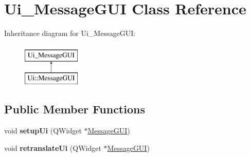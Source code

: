 \hypertarget{classUi__MessageGUI}{}\section{Ui\+\_\+\+Message\+G\+UI Class Reference}
\label{classUi__MessageGUI}
Inheritance diagram for Ui\+\_\+\+Message\+G\+UI\+:\begin{figure}[H]
\begin{center}
\leavevmode
\includegraphics[height=2.000000cm]{classUi__MessageGUI}
\end{center}
\end{figure}
\subsection*{Public Member Functions}
\begin{DoxyCompactItemize}
\item 
void {\bfseries setup\+Ui} (Q\+Widget $\ast$\hyperlink{classMessageGUI}{Message\+G\+UI})\hypertarget{classUi__MessageGUI_afab856f1f64d12128feb816c8755b846}{}\label{classUi__MessageGUI_afab856f1f64d12128feb816c8755b846}

\item 
void {\bfseries retranslate\+Ui} (Q\+Widget $\ast$\hyperlink{classMessageGUI}{Message\+G\+UI})\hypertarget{classUi__MessageGUI_acd506f5758761f4c5cafada3396d8a83}{}\label{classUi__MessageGUI_acd506f5758761f4c5cafada3396d8a83}

\end{DoxyCompactItemize}
